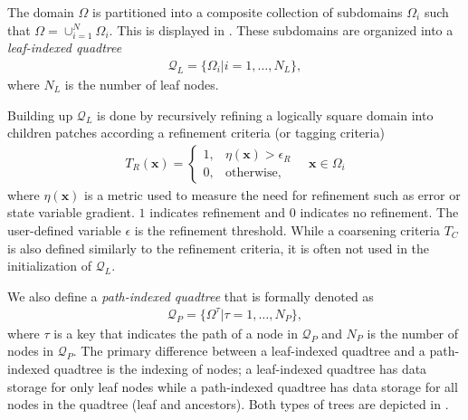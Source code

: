 The domain $\Omega$ is partitioned into a composite collection of subdomains $\Omega_i$ such that $\Omega = \cup_{i = 1}^{N} \Omega_i$. This is displayed in . These subdomains are organized into a {\em leaf-indexed quadtree}
\begin{align}
    \mathcal{Q}_L = \{\Omega_i | i = 1, \dots, N_L\},
    \label{eq:leaf-indexed-quadtree}
\end{align}
where $N_L$ is the number of leaf nodes.  Building up $\mathcal{Q}_L$ is done by recursively refining a logically square domain into children patches according a refinement criteria (or tagging criteria)
\begin{align}
    T_{R} (\textbf{x}) =
    \begin{cases}
        1,& \eta(\textbf{x}) > \epsilon_{R} \\
        0,& \text{otherwise},
    \end{cases}
    \quad \textbf{x} \in \Omega_i
\end{align}
where $\eta(\textbf{x})$ is a metric used to measure the need for refinement such as error or state variable gradient. $1$ indicates refinement and $0$ indicates no refinement. The user-defined variable $\epsilon$ is the refinement threshold. While a coarsening criteria $T_{C}$ is also defined similarly to the refinement criteria, it is often not used in the initialization of $\mathcal{Q}_L$.

We also define a {\em path-indexed quadtree} that is formally denoted as
\begin{align}
    \mathcal{Q}_P = \{\Omega^{\tau} | \tau = 1, \dots, N_P\},
    \label{eq:path-indexed-quadtree}
\end{align}
where $\tau$ is a key that indicates the path of a node in $\mathcal{Q}_P$ and $N_P$ is the number of nodes in $\mathcal{Q}_P$. The primary difference between a leaf-indexed quadtree and a path-indexed quadtree is the indexing of nodes; a leaf-indexed quadtree has data storage for only leaf nodes while a path-indexed quadtree has data storage for all nodes in the quadtree (leaf and ancestors). Both types of trees are depicted in .

